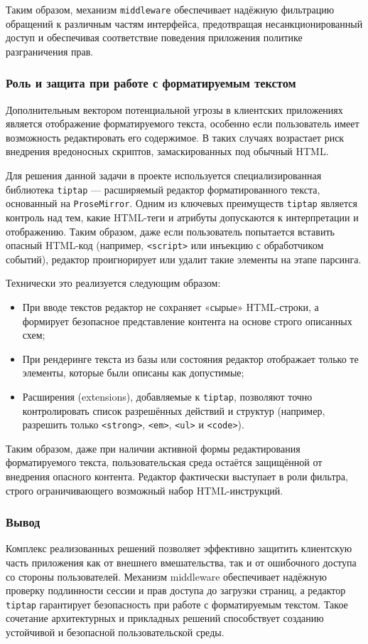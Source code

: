 Таким образом, механизм \texttt{middleware} обеспечивает надёжную фильтрацию обращений к различным частям интерфейса, предотвращая несанкционированный доступ и обеспечивая соответствие поведения приложения политике разграничения прав.

\subsubsection{Роль и защита при работе с форматируемым текстом}

Дополнительным вектором потенциальной угрозы в клиентских приложениях является отображение форматируемого текста, особенно если пользователь имеет возможность редактировать его содержимое. В таких случаях возрастает риск внедрения вредоносных скриптов, замаскированных под обычный HTML.

Для решения данной задачи в проекте используется специализированная библиотека \texttt{tiptap} — расширяемый редактор форматированного текста, основанный на \texttt{ProseMirror}. Одним из ключевых преимуществ \texttt{tiptap} является контроль над тем, какие HTML-теги и атрибуты допускаются к интерпретации и отображению. Таким образом, даже если пользователь попытается вставить опасный HTML-код (например, \texttt{<script>} или инъекцию с обработчиком событий), редактор проигнорирует или удалит такие элементы на этапе парсинга.

Технически это реализуется следующим образом:
\begin{itemize}
  \item При вводе текстов редактор не сохраняет «сырые» HTML-строки, а формирует безопасное представление контента на основе строго описанных схем;
  \item При рендеринге текста из базы или состояния редактор отображает только те элементы, которые были описаны как допустимые;
  \item Расширения (extensions), добавляемые к \texttt{tiptap}, позволяют точно контролировать список разрешённых действий и структур (например, разрешить только \texttt{<strong>}, \texttt{<em>}, \texttt{<ul>} и \texttt{<code>}).
\end{itemize}

Таким образом, даже при наличии активной формы редактирования форматируемого текста, пользовательская среда остаётся защищённой от внедрения опасного контента. Редактор фактически выступает в роли фильтра, строго ограничивающего возможный набор HTML-инструкций.

\subsubsection{Вывод}

Комплекс реализованных решений позволяет эффективно защитить клиентскую часть приложения как от внешнего вмешательства, так и от ошибочного доступа со стороны пользователей. Механизм middleware обеспечивает надёжную проверку подлинности сессии и прав доступа до загрузки страниц, а редактор \texttt{tiptap} гарантирует безопасность при работе с форматируемым текстом. Такое сочетание архитектурных и прикладных решений способствует созданию устойчивой и безопасной пользовательской среды.
